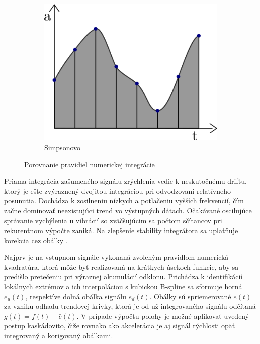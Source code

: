 \begin{figure}[h]
\hfill
\begin{subfigure}[b]{0.32\textwidth}
    \centering
    \includegraphics[width=\textwidth]{figures/analysis/simpson-rule.png}
    \caption{Simpsonovo}
    \label{fig:simpson-rule}
\end{subfigure}
\caption{Porovnanie pravidiel numerickej integrácie}
\end{figure}

Priama integrácia zašumeného signálu zrýchlenia vedie k neskutočnému driftu, ktorý je ešte zvýraznený dvojitou integráciou pri
odvodzovaní relatívneho posunutia. Dochádza k zosilneniu nízkych a potlačeniu vyšších frekvencií, čím začne dominovať neexistujúci
trend vo výstupných dátach. Očakávané oscilujúce správanie vychýlenia u vibrácií so zväčšujúcim sa počtom sčítancov pri rekurentnom
výpočte zaniká. Na zlepšenie stability integrátora sa uplatňuje korekcia cez obálky \cite{integration-acceleration-envelopes}.

Najprv je na vstupnom signále vykonaná zvoleným pravidlom numerická kvadratúra, ktorá môže byť realizovaná na krátkych
úsekoch funkcie, aby sa predišlo pretečeniu pri výraznej akumulácií odklonu. Prichádza k identifikácií lokálnych extrémov a ich
interpoláciou s kubickou B-spline sa sformuje horná $e_u(t)$, respektíve dolná
obálka signálu $e_d(t)$. Obálky sú spriemerované $\bar{e}(t)$ za vzniku odhadu trendovej krivky, ktorá je od už integrovaného
signálu odčítaná $g(t) = f(t) - \bar{e}(t)$. V prípade výpočtu polohy je možné aplikovať uvedený postup kaskádovito, čiže rovnako
ako akcelerácia je aj signál rýchlosti opäť integrovaný a korigovaný obálkami.

